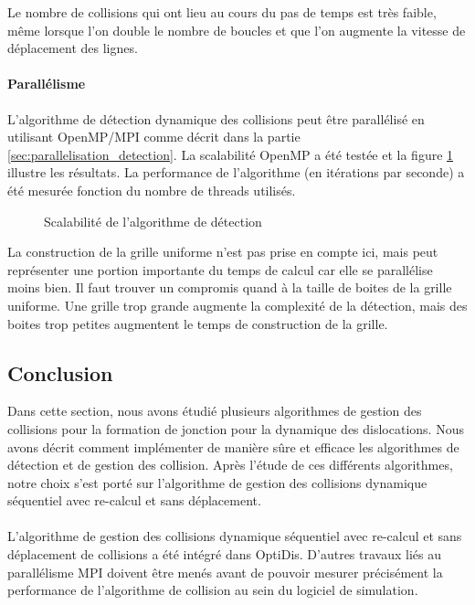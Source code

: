 \documentclass[11pt,class=article,float=false,crop=false]{standalone}
\begin{document}
Le nombre de collisions qui ont lieu au cours du pas de temps est très faible, même lorsque l'on double le nombre de boucles et que l'on augmente la vitesse de déplacement des lignes.

\paragraph{Parallélisme}

L'algorithme de détection dynamique des collisions peut être parallélisé en utilisant OpenMP/MPI comme décrit dans la partie \ref{sec:parallelisation_detection}. La scalabilité OpenMP a été testée et la figure \ref{fig:speedup_detection} illustre les résultats. La performance de l'algorithme (en itérations par seconde) a été mesurée fonction du nombre de threads utilisés.

\begin{figure}[H]
	\centering
	\caption{Scalabilité de l'algorithme de détection}
	\label{fig:speedup_detection}
\end{figure}

La construction de la grille uniforme n'est pas prise en compte ici, mais peut représenter une portion importante du temps de calcul car elle se parallélise moins bien. Il faut trouver un compromis quand à la taille de boites de la grille uniforme. Une grille trop grande augmente la complexité de la détection, mais des boites trop petites augmentent le temps de construction de la grille.


\subsection*{Conclusion}

Dans cette section, nous avons étudié plusieurs algorithmes de gestion des collisions pour la formation de jonction pour la dynamique des dislocations. Nous avons décrit comment implémenter de manière sûre et efficace les algorithmes de détection et de gestion des collision. Après l'étude de ces différents algorithmes, notre choix s'est porté sur l'algorithme de gestion des collisions dynamique séquentiel avec re-calcul et sans déplacement. 

\paragraph{}
L'algorithme de gestion des collisions dynamique séquentiel avec re-calcul et sans déplacement de collisions a été intégré dans OptiDis. D'autres travaux liés au parallélisme MPI doivent être menés avant de pouvoir mesurer précisément la performance de l'algorithme de collision au sein du logiciel de simulation.
\end{document}
